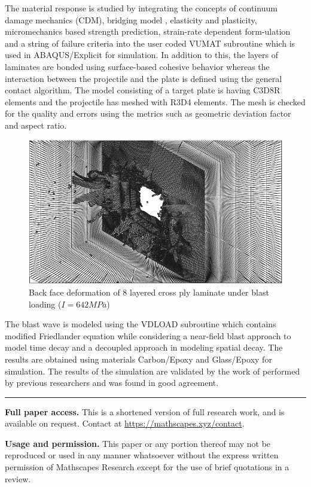 \documentclass[a4paper,11pt, hidelinks]{article}
\begin{document}
The material response is studied by integrating the concepts of continuum damage mechanics (CDM), bridging model\cite{ye_zhang_2012} , elasticity and plasticity\cite{zhang_gu_sun_2017}, micromechanics based strength prediction\cite{huang_1999}, strain-rate dependent form-ulation\cite{xin_wen_2015} and a string of failure criteria into the user coded VUMAT subroutine which is used in ABAQUS/Explicit for simulation. In addition to this, the layers of laminates are bonded using surface-based cohesive behavior whereas the interaction between the projectile and the plate is defined using the general contact algorithm. The model consisting of a target plate is having C3D8R elements and the projectile has meshed with R3D4 elements. The mesh is checked for the quality and errors using the metrics such as geometric deviation factor and aspect ratio.

\begin{figure}[h]
  \centering
  \includegraphics{1.pdf}
  \caption{Back face deformation of 8 layered cross ply laminate under blast loading ($I = 642 MPa$)}
\end{figure}


The blast wave is modeled using the VDLOAD subroutine which contains modified Friedlander equation while considering a near-field blast approach to model time decay and a decoupled approach in modeling spatial decay. The results are obtained using materials Carbon/Epoxy and Glass/Epoxy for simulation. The results of the simulation are validated by the work of performed by previous researchers\cite{bandaru_ahmad_2016}\cite{sevkat_liaw_delale_raju_2009} and was found in good agreement.




\vspace*{\fill}
\rule{\textwidth}{0.4pt}
\footnotesize \textbf{Full paper access.} This is a shortened version of full research work, and is available on request. Contact at \url{https://mathscapes.xyz/contact}.

\footnotesize \textbf{Usage and permission.} This paper or any portion thereof may not be reproduced or used in any manner whatsoever without the express written permission of Mathscapes Research except for the use of brief quotations in a review.
\end{document}
